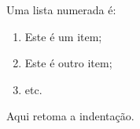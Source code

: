 Uma lista numerada é:
\begin{enumerate}
 \renewcommand{\theenumi}{\Roman{enumi}}
 \item Este é um item;
 \item Este é outro item;
 \item etc.
\end{enumerate}
Aqui retoma a indentação.
